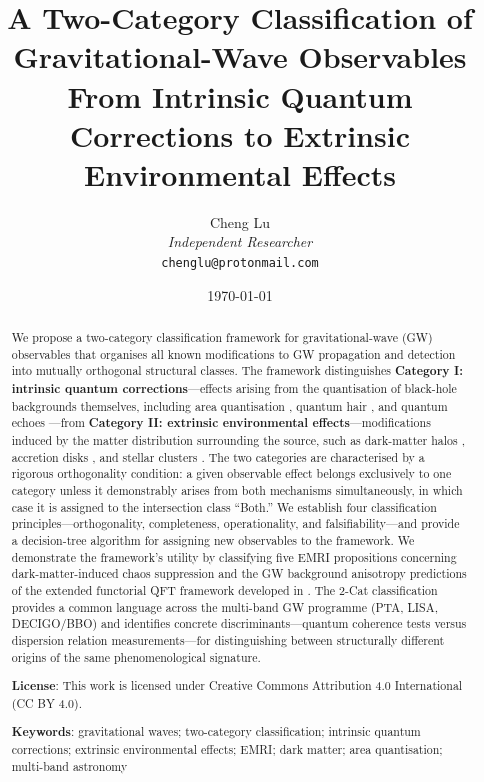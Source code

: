 \documentclass[11pt]{article}
\title{\textbf{A Two-Category Classification of Gravitational-Wave Observables\\From Intrinsic Quantum Corrections to Extrinsic Environmental Effects}}
\author{Cheng Lu\\
\textit{Independent Researcher}\\
\vspace{0.5em}
\texttt{chenglu@protonmail.com}
}
\date{\today}
\begin{document}
\maketitle

\begin{abstract}
We propose a two-category classification framework for gravitational-wave (GW) observables that organises all known modifications to GW propagation and detection into mutually orthogonal structural classes. The framework distinguishes \textbf{Category I: intrinsic quantum corrections}---effects arising from the quantisation of black-hole backgrounds themselves, including area quantisation \cite{Bekenstein:1994,Mukhanov:1996}, quantum hair \cite{Haggard:2014}, and quantum echoes \cite{Cardoso:2016vtg}---from \textbf{Category II: extrinsic environmental effects}---modifications induced by the matter distribution surrounding the source, such as dark-matter halos \cite{Barausse:2020}, accretion disks \cite{Frank:2021}, and stellar clusters \cite{Gair:2013}. The two categories are characterised by a rigorous orthogonality condition: a given observable effect belongs exclusively to one category unless it demonstrably arises from both mechanisms simultaneously, in which case it is assigned to the intersection class ``Both.'' We establish four classification principles---orthogonality, completeness, operationality, and falsifiability---and provide a decision-tree algorithm for assigning new observables to the framework. We demonstrate the framework's utility by classifying five EMRI propositions concerning dark-matter-induced chaos suppression and the GW background anisotropy predictions of the extended functorial QFT framework developed in \cite{GW-BacQFT}. The 2-Cat classification provides a common language across the multi-band GW programme (PTA, LISA, DECIGO/BBO) and identifies concrete discriminants---quantum coherence tests versus dispersion relation measurements---for distinguishing between structurally different origins of the same phenomenological signature.

\vspace{0.5em}
\noindent\textbf{License}: This work is licensed under Creative Commons Attribution 4.0 International (CC BY 4.0).

\vspace{0.5em}
\noindent\textbf{Keywords}: gravitational waves; two-category classification; intrinsic quantum corrections; extrinsic environmental effects; EMRI; dark matter; area quantisation; multi-band astronomy

\end{abstract}
\end{document}
